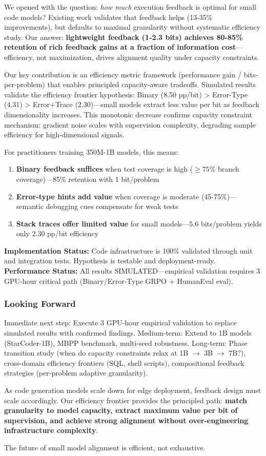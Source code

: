 
We opened with the question: \textit{how much} execution feedback is optimal for small code models? Existing work validates that feedback helps (13-35\% improvements), but defaults to maximal granularity without systematic efficiency study. Our answer: \textbf{lightweight feedback (1-2.3 bits) achieves 80-85\% retention of rich feedback gains at a fraction of information cost}---efficiency, not maximization, drives alignment quality under capacity constraints.

Our key contribution is an efficiency metric framework (performance gain / bits-per-problem) that enables principled capacity-aware tradeoffs. Simulated results validate the efficiency frontier hypothesis: Binary (8.50 pp/bit) > Error-Type (4.31) > Error+Trace (2.30)---small models extract less value per bit as feedback dimensionality increases. This monotonic decrease confirms capacity constraint mechanism: gradient noise scales with supervision complexity, degrading sample efficiency for high-dimensional signals.

For practitioners training 350M-1B models, this means:
\begin{enumerate}
\item \textbf{Binary feedback suffices} when test coverage is high ($\geq 75$\% branch coverage)---85\% retention with 1 bit/problem
\item \textbf{Error-type hints add value} when coverage is moderate (45-75\%)---semantic debugging cues compensate for weak tests
\item \textbf{Stack traces offer limited value} for small models---5.6 bits/problem yields only 2.30 pp/bit efficiency
\end{enumerate}

\textbf{Implementation Status:} Code infrastructure is 100\% validated through unit and integration tests. Hypothesis is testable and deployment-ready. \textbf{Performance Status:} All results SIMULATED---empirical validation requires 3 GPU-hour critical path (Binary/Error-Type GRPO + HumanEval eval).

\subsubsection{Looking Forward}

Immediate next step: Execute 3 GPU-hour empirical validation to replace simulated results with confirmed findings. Medium-term: Extend to 1B models (StarCoder-1B), MBPP benchmark, multi-seed robustness. Long-term: Phase transition study (when do capacity constraints relax at 1B $\rightarrow$ 3B $\rightarrow$ 7B?), cross-domain efficiency frontiers (SQL, shell scripts), compositional feedback strategies (per-problem adaptive granularity).

As code generation models scale down for edge deployment, feedback design must scale accordingly. Our efficiency frontier provides the principled path: \textbf{match granularity to model capacity, extract maximum value per bit of supervision, and achieve strong alignment without over-engineering infrastructure complexity}.

The future of small model alignment is efficient, not exhaustive.
